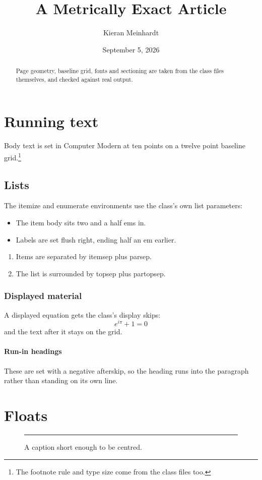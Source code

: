 \documentclass[a4paper,10pt]{article}
\title{A Metrically Exact Article}
\author{Kieran Meinhardt}
\date{September 5, 2026}
\begin{document}
\maketitle

\begin{abstract}
Page geometry, baseline grid, fonts and sectioning are taken from the class
files themselves, and checked against real output.
\end{abstract}

\section{Running text}

Body text is set in Computer Modern at ten points on a twelve point baseline
grid.\footnote{The footnote rule and type size come from the class files too.}

\subsection{Lists}

The itemize and enumerate environments use the class's own list parameters:

\begin{itemize}
\item The item body sits two and a half ems in.
\item Labels are set flush right, ending half an em earlier.
\end{itemize}

\begin{enumerate}
\item Items are separated by itemsep plus parsep.
\item The list is surrounded by topsep plus partopsep.
\end{enumerate}

\subsubsection{Displayed material}

A displayed equation gets the class's display skips:
\[ e^{i\pi} + 1 = 0 \]
and the text after it stays on the grid.

\paragraph{Run-in headings} These are set with a negative afterskip, so the
heading runs into the paragraph rather than standing on its own line.

\section{Floats}

\begin{figure}[h]
\centering
\rule{4cm}{1.4cm}
\caption{A caption short enough to be centred.}
\end{figure}
\end{document}
